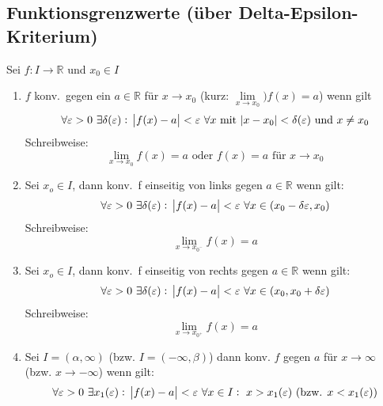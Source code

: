 \documentclass[10pt]{article}
\newcommand{\R}{\mathbb{R}}
\begin{document}
    \subsection{Funktionsgrenzwerte (über Delta-Epsilon-Kriterium)}
    Sei $f: I \rightarrow \R$ und $x_0 \in I$
    \begin{enumerate}[label= (\alph*)]
        \item $f$ konv.\ gegen ein $a\in \R$ für $x \rightarrow x_0$
            (kurz: $\lim\limits_{x \rightarrow x_0}) f(x)=a$) wenn gilt
            \begin{equation*}
                \forall \varepsilon > 0\ \exists \delta(\varepsilon):\
                \abs{f(x) - a} < \varepsilon\ \forall x \text{ mit }
                \abs{x- x_0} < \delta(\varepsilon) \text{ und } x \neq x_0
            \end{equation*}
            Schreibweise:
            \begin{equation*}
                \lim_{x \rightarrow x_0} f(x) = a
                \text{ oder } f(x)=a \text{ für } x \rightarrow x_0
            \end{equation*}
        \item Sei $x_o \in I$, dann konv.\ f einseitig von links
            gegen $a\in\R$ wenn gilt:
            \begin{equation*}
                \forall \varepsilon > 0\  \exists \delta(\varepsilon):\
                \abs{f(x) -a} < \varepsilon\ \forall x \in
                (x_0 - \delta{\varepsilon}, x_0)
             \end{equation*}
            Schreibweise:
            \begin{equation*}
                \lim_{x \rightarrow x_{0^-}} f(x) = a
            \end{equation*}
        \item Sei $x_o \in I$, dann konv.\ f einseitig von rechts
            gegen $a\in\R$ wenn gilt:
            \begin{equation*}
                \forall \varepsilon > 0\  \exists \delta(\varepsilon):\
                \abs{f(x) -a} < \varepsilon\ \forall x \in
                (x_0 , x_0 + \delta{\varepsilon})
             \end{equation*}
            Schreibweise:
            \begin{equation*}
                \lim_{x \rightarrow x_{0^+}} f(x) = a
            \end{equation*}
        \item Sei $I = (\alpha, \infty)$ (bzw. $I = (-\infty, \beta)$) dann
            konv. $f$ gegen $a$ für $x \rightarrow \infty$
            (bzw. $x \rightarrow -\infty$) wenn gilt:
            \begin{equation*}
                \forall \varepsilon > 0\ \exists x_1(\varepsilon):\
                \abs{f(x) - a}<\varepsilon\ \forall x \in I:\ x > x_1(\varepsilon)
                \text{ (bzw. } x < x_1(\varepsilon) \text{)}
            \end{equation*}
    \end{enumerate}
\end{document}
